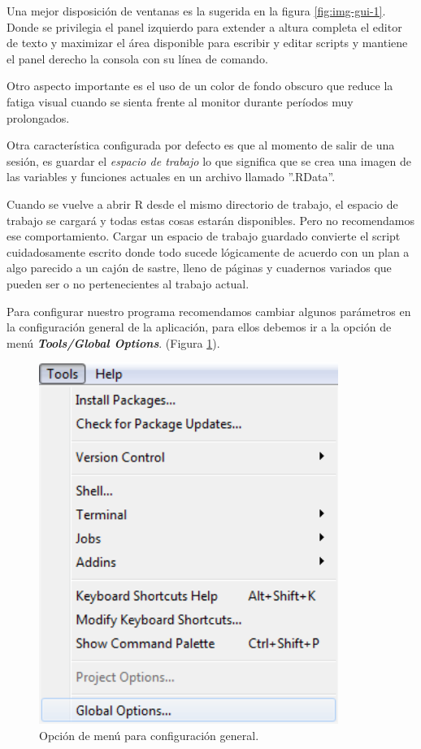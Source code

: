 \documentclass[
]{book}
\begin{document}
Una mejor disposición de ventanas es la sugerida en la figura \ref{fig:img-gui-1}. Donde se privilegia el panel izquierdo para extender a altura completa el editor de texto y maximizar el área disponible para escribir y editar scripts y mantiene el panel derecho la consola con su línea de comando.

Otro aspecto importante es el uso de un color de fondo obscuro que reduce la fatiga visual cuando se sienta frente al monitor durante períodos muy prolongados.

Otra característica configurada por defecto es que al momento de salir de una sesión, es guardar el \emph{espacio de trabajo} lo que significa que se crea una imagen de las variables y funciones actuales en un archivo llamado ''.RData''.

Cuando se vuelve a abrir R desde el mismo directorio de trabajo, el espacio de trabajo se cargará y todas estas cosas estarán disponibles. Pero no recomendamos ese comportamiento. Cargar un espacio de trabajo guardado convierte el script cuidadosamente escrito donde todo sucede lógicamente de acuerdo con un plan a algo parecido a un cajón de sastre, lleno de páginas y cuadernos variados que pueden ser o no pertenecientes al trabajo actual.

Para configurar nuestro programa recomendamos cambiar algunos parámetros en la configuración general de la aplicación, para ellos debemos ir a la opción de menú \textbf{\emph{Tools/Global Options}}. (Figura \ref{fig:img-gui-2}).

\begin{figure}

{\centering \includegraphics[width=3.83in]{img/mnuOptions} 

}

\caption{Opción de menú para configuración general.}\label{fig:img-gui-2}
\end{figure}
\end{document}
